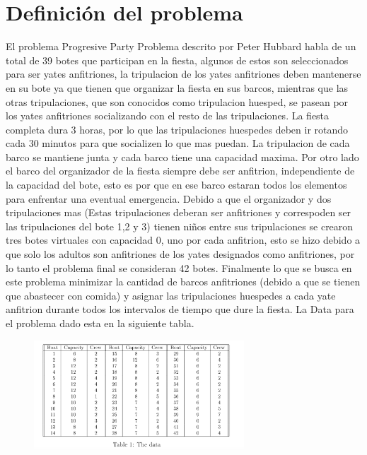 \documentclass[spanish, fleqn]{article}
\begin{document}
\section{Definición del problema}

El problema Progresive Party Problema descrito por Peter Hubbard habla de un total de 39 botes que participan en la fiesta, algunos de estos son seleccionados para ser yates anfitriones, la tripulacion de los yates anfitriones deben mantenerse en su bote ya que tienen que organizar la fiesta en sus barcos, mientras que las otras tripulaciones, que son conocidos como tripulacion huesped, se pasean por los yates anfitriones socializando con el resto de las tripulaciones. La fiesta completa dura 3 horas, por lo que las tripulaciones huespedes deben ir rotando cada 30 minutos para que socializen lo que mas puedan. La tripulacion de cada barco se mantiene junta y cada barco tiene una capacidad maxima. Por otro lado el barco del organizador de la fiesta siempre debe ser anfitrion, independiente de la capacidad del bote, esto es por que en ese barco estaran todos los elementos para enfrentar una eventual emergencia. Debido a que el organizador y dos tripulaciones mas (Estas tripulaciones deberan ser anfitriones y correspoden ser las tripulaciones del bote 1,2 y 3) tienen niños entre sus tripulaciones  se crearon tres botes virtuales con capacidad 0, uno por cada anfitrion, esto se hizo debido a que solo los adultos son anfitriones de los yates designados como anfitriones, por lo tanto el problema final se consideran 42 botes. Finalmente lo que se busca en este problema minimizar la cantidad de barcos anfitriones (debido a que se tienen que abastecer con comida) y asignar las tripulaciones huespedes a cada yate anfitrion durante todos los intervalos de tiempo que dure la fiesta. La Data para el problema dado esta en la siguiente tabla.

\begin{figure}[!h]
  \centering
    \includegraphics[width=0.7\textwidth]{1}
  \label{fig:DiagramaBarra2}
\end{figure}
\end{document}
